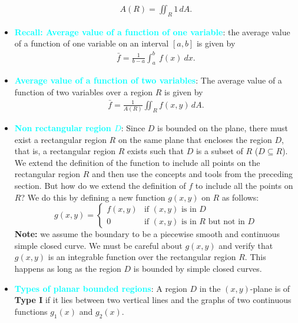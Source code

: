 \documentclass{report}
\begin{document}
\begin{itemize}
            \begin{align*}
                A(R) = \iint_{R}1\,dA
            .\end{align*}
        \item \textbf{\textcolor{cyan}{Recall: Average value of a function of one variable}}: the average value of a function of one variable on an interval  $[a,b]$ is given by
            \begin{align*}
                \bar{f} = \frac{1}{b-a}\int_{a}^{b}\ f(x)\ dx
            .\end{align*}
        \item \textbf{\textcolor{cyan}{Average value of a function of two variables}}: The average value of a function of two variables over a region $R$ is given by
            \begin{align*}
                \bar{f} = \frac{1}{A(R)} \iint_{R}f(x,y)\,dA
            .\end{align*}
        \item \textbf{\textcolor{cyan}{Non rectangular region $D$}}:
            Since \(D\) is bounded on the plane, there must exist a rectangular region \(R\) on the same plane that encloses the region \(D\), that is, a rectangular region \(R\) exists such that \(D\) is a subset of \(R\) (\(D \subseteq R\)).
            \bigbreak \noindent 
            We extend the definition of the function to include all points on the rectangular region \(R\) and then use the concepts and tools from the preceding section. But how do we extend the definition of \(f\) to include all the points on \(R\)? We do this by defining a new function \(g(x,y)\) on \(R\) as follows:
            \[
                g(x,y) = 
                \begin{cases} 
                    f(x,y) & \text{if } (x,y) \text{ is in } D \\
                    0 & \text{if } (x,y) \text{ is in } R \text{ but not in } D
                \end{cases}
            \]
            \bigbreak \noindent 
            \textbf{Note:} we assume the boundary to be a piecewise smooth and continuous simple closed curve. We must be careful about \(g(x,y)\) and verify that \(g(x,y)\) is an integrable function over the rectangular region \(R\). This happens as long as the region \(D\) is bounded by simple closed curves.
        \item \textbf{\textcolor{cyan}{Types of planar bounded regions}}:
            A region \(D\) in the \((x,y)\)-plane is of \textbf{Type I} if it lies between two vertical lines and the graphs of two continuous functions \(g_1(x)\) and \(g_2(x)\). 

\end{itemize}
\end{document}
